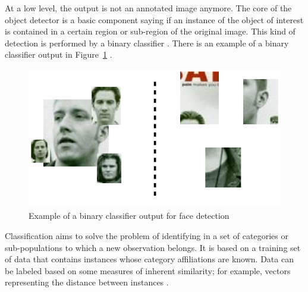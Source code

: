 \noindent At a low level, the output is not an annotated image anymore. The core of the object detector is a basic component saying if an instance of the object of interest is contained in a certain region or sub-region of the original image. This kind of detection is performed by a binary classifier \cite{DIN08}. There is an example of a binary classifier output in Figure~\ref{output_example_face_detection_binary_classifier} \cite{DIN08}.
\newline

\begin{figure}[!h]
\begin{center}
\noindent \includegraphics[scale=0.5]{figures/output_example_face_detection_binary_classifier} 
\newline
\caption{Example of a binary classifier output for face detection \cite{DIN08}}
\label{output_example_face_detection_binary_classifier}
\end{center} 
\end{figure}

\noindent Classification aims to solve the problem of identifying in a set of categories or sub-populations to which a new observation belongs. It is based on a training set of data that contains instances whose category affiliations are known. Data can be labeled based on some measures of inherent similarity; for example, vectors representing the distance between instances \cite{CLASS}.
\newline









